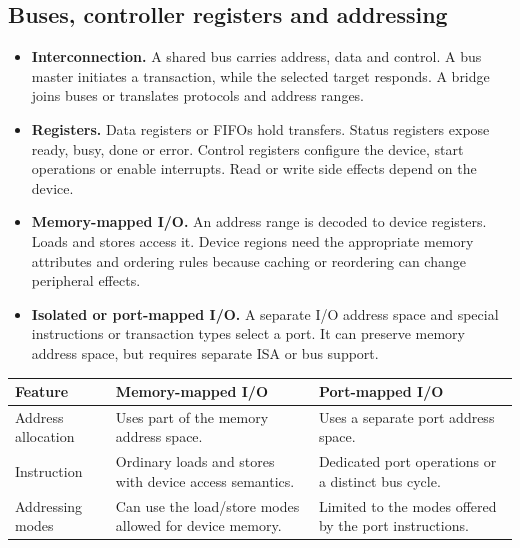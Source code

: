 \documentclass[12pt,a4paper]{article}
\begin{document}
\subsection{Buses, controller registers and addressing}
\begin{itemize}[leftmargin=*,itemsep=3pt]
\item \textbf{Interconnection.} A shared bus carries address, data and control. A bus master initiates a transaction, while the selected target responds. A bridge joins buses or translates protocols and address ranges.
\item \textbf{Registers.} Data registers or FIFOs hold transfers. Status registers expose ready, busy, done or error. Control registers configure the device, start operations or enable interrupts. Read or write side effects depend on the device.
\item \textbf{Memory-mapped I/O.} An address range is decoded to device registers. Loads and stores access it. Device regions need the appropriate memory attributes and ordering rules because caching or reordering can change peripheral effects.
\item \textbf{Isolated or port-mapped I/O.} A separate I/O address space and special instructions or transaction types select a port. It can preserve memory address space, but requires separate ISA or bus support.
\end{itemize}
\par\vspace{6pt}\noindent
\begin{tabularx}{\linewidth}{|B{2.6cm}|Y|Y|}\hline
Feature & Memory-mapped I/O & Port-mapped I/O \\ \hline
Address allocation & Uses part of the memory address space. & Uses a separate port address space. \\ \hline
Instruction & Ordinary loads and stores with device access semantics. & Dedicated port operations or a distinct bus cycle. \\ \hline
Addressing modes & Can use the load/store modes allowed for device memory. & Limited to the modes offered by the port instructions. \\ \hline
\end{tabularx}

\begin{tcolorbox}[tikzbox,title={CPU, main memory and the peripheral interface},unbreakable]
\centering
{}
\end{tcolorbox}
\end{document}
